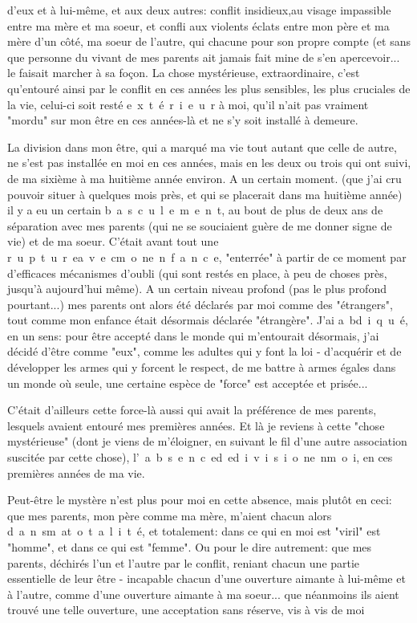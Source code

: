 

d'eux et à lui-même, et aux deux autres: conflit insidieux,au visage impassible entre ma mère et ma soeur, et confli aux violents éclats entre mon père et ma mère d'un côté, ma soeur de l'autre, qui chacune pour son propre compte (et sans que personne du vivant de mes parents ait jamais fait mine de s'en apercevoir... le faisait marcher à sa foçon. La chose mystérieuse, extraordinaire, c'est qu'entouré ainsi par le conflit en ces années les plus sensibles, les plus cruciales de la vie, celui-ci soit resté \mbox{e x t é r i e u r} à moi, qu'il n'ait pas vraiment "mordu" sur mon être en ces années-là et ne s'y soit installé à demeure.

La division dans mon être, qui a marqué ma vie tout autant que celle de  autre, ne s'est pas installée en moi en ces années, mais en les deux ou trois  qui ont suivi, de ma sixième à ma huitième année environ. A un certain moment. (que j'ai cru pouvoir situer à quelques mois près, et qui se placerait dans ma huitième année) il y a eu un certain \mbox{b a s c u l e m e n t}, au bout de plus de deux ans de séparation avec mes parents (qui ne se souciaient guère de me donner signe de vie) et de ma soeur. C'était avant tout une \mbox{r u p t u r e}\quad\mbox{a v e c}\quad\mbox{m o n}\quad\mbox{e n f a n c e}, "enterrée" à partir de ce moment par d'efficaces mécanismes d'oubli (qui sont restés en place, à peu de choses près, jusqu'à aujourd'hui même). A un certain niveau profond (pas le plus profond pourtant...) mes parents ont alors été déclarés par moi comme des "étrangers", tout comme mon enfance était désormais déclarée "étrangère". J'ai \mbox{a bd i q u é}, en un sens: pour être accepté dans le monde qui m'entourait désormais, j'ai décidé d'être comme "eux", comme les adultes qui y font la loi - d'acquérir et de développer les armes qui y forcent le respect, de me battre à armes égales dans un monde où seule, une certaine espèce de "force" est acceptée et prisée...

C'était d'ailleurs cette force-là aussi qui avait la préférence de mes parents, lesquels avaient entouré mes premières années. Et là je reviens à cette "chose mystérieuse" (dont je viens de m'éloigner, en suivant le fil d'une autre association suscitée par cette chose), \mbox{l' a b s e n c e}\quad\mbox{d e}\quad\mbox{d i v i s i o n}\quad\mbox{e n}\quad\mbox{m o i}, en ces premières années de ma vie.

Peut-être le mystère n'est plus pour moi en cette absence, mais plutôt en ceci: que mes parents, mon père comme ma mère, m'aient chacun alors \mbox{}\quad\mbox{d a n s}\quad\mbox{m a}\quad\mbox{t o t a l i t é}, et totalement: dans ce qui en moi est "viril" est "homme", et dans ce qui est "femme". Ou pour le dire autrement: que mes parents, déchirés l'un et l'autre par le conflit, reniant chacun une partie essentielle de leur être - incapable chacun d'une ouverture aimante à lui-même et à l'autre, comme d'une ouverture aimante à ma soeur... que néanmoins ils aient trouvé une telle ouverture, une acceptation sans réserve, vis à vis de moi

